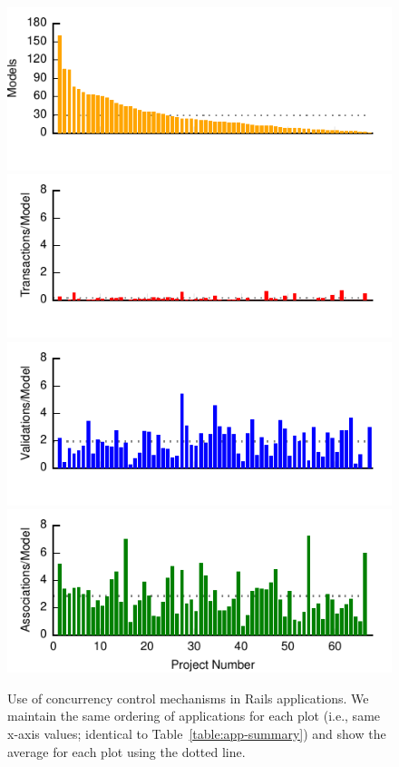\begin{figure}
  \newcommand{\skipht}{\\[-2em]}
\includegraphics[width=\columnwidth]{figs/models-single-bar.pdf}\skipht
\includegraphics[width=\columnwidth]{figs/transactions-single-bar.pdf}\skipht
\includegraphics[width=\columnwidth]{figs/validations-single-bar.pdf}\skipht
\includegraphics[width=\columnwidth]{figs/associations-single-bar.pdf}\skipht
\caption{Use of concurrency control mechanisms in Rails
  applications. We maintain the same ordering of applications for each
  plot (i.e., same x-axis values; identical to
  Table~\ref{table:app-summary}) and show the average for each plot
  using the dotted line.}
\label{fig:usages}
\end{figure}



